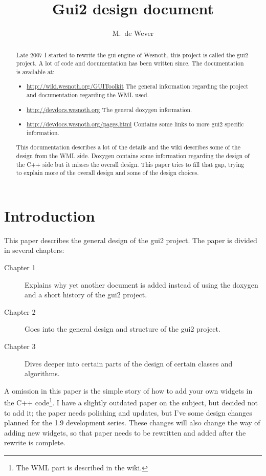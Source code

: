 \documentclass[a4paper,notitlepage]{report}
\author{M.~de Wever}
\title{Gui2 design document}
\begin{document}
\maketitle

\tableofcontents

\begin{abstract}

Late 2007 I started to rewrite the gui engine of Wesnoth, this project is called
the gui2 project. A lot of code and documentation has been written since. The
documentation is available at:
\begin{itemize}
\item \url{http://wiki.wesnoth.org/GUIToolkit} The general information
	regarding the project and documentation regarding the WML used.
\item \url{http://devdocs.wesnoth.org} The general doxygen information.
\item \url{http://devdocs.wesnoth.org/pages.html} Contains some links to more
	gui2 specific information.
\end{itemize}

This documentation describes a lot of the details and the wiki describes some of
the design from the WML side. Doxygen contains some information regarding the
design of the C++ side but it misses the overall design. This paper tries to
fill that gap, trying to explain more of the overall design and some of the
design choices.

\end{abstract}


\chapter{Introduction}

This paper describes the general design of the gui2 project. The paper is
divided in several chapters:
\begin{description}
\item[Chapter 1] Explains why yet another document is added instead of using the
	doxygen and a short history of the gui2 project.
\item[Chapter 2] Goes into the general design and structure of the gui2 project.
\item[Chapter 3] Dives deeper into certain parts of the design of certain
	classes and algorithms.
\end{description}

A omission in this paper is the simple story of how to add your own widgets in
the C++ code\footnote{The WML part is described in the wiki.}. I have a slightly
outdated paper on the subject, but decided not to add it; the paper needs
polishing and updates, but I've some design changes planned for the 1.9
development series. These changes will also change the way of adding new
widgets, so that paper needs to be rewritten and added after the rewrite is
complete.
\end{document}
